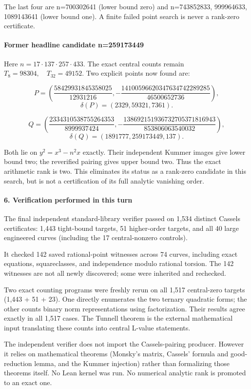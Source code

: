 \documentclass[11pt]{article}
\begin{document}
The last four are n=700302641 (lower bound zero) and n=743852833, 999964633, 1089143641 (lower bound one). A finite failed point search is never a rank-zero certificate.

\paragraph{Former headline candidate n=259173449}

Here \(n=17\cdot137\cdot257\cdot433\). The exact central counts remain \(T_8=98304,\quad T_{32}=49152\). Two explicit points now found are:

\[
P=\left(\frac{58429931845358025}{12931216},
-\frac{14100596620347634742289285}{46500652736}\right),
\] \[\delta(P)=(2329,59321,7361).\]

\[
Q=\left(\frac{2334310538755264353}{8999937424},
-\frac{138692151936732705371816943}{853806063540032}\right),
\] \[\delta(Q)=(1891777,259173449,137).\]

Both lie on \(y^2=x^3-n^2x\) exactly. Their independent Kummer images give lower bound two; the reverified pairing gives upper bound two. Thus the exact arithmetic rank is two. This eliminates its status as a rank-zero candidate in this search, but is not a certification of its full analytic vanishing order.

\paragraph{6. Verification performed in this turn}

The final independent standard-library verifier passed on 1,534 distinct Cassels certificates: 1,443 tight-bound targets, 51 higher-order targets, and all 40 large engineered curves (including the 17 central-nonzero controls).

It checked 142 saved rational-point witnesses across 74 curves, including exact equations, squareclasses, and independence modulo rational torsion. The 142 witnesses are not all newly discovered; some were inherited and rechecked.

Two exact counting programs were freshly rerun on all 1,517 central-zero targets (1,443 + 51 + 23). One directly enumerates the two ternary quadratic forms; the other counts binary norm representations using factorization. Their results agree exactly in all 1,517 cases. The Tunnell theorem is the external mathematical input translating these counts into central L-value statements.

The independent verifier does not import the Cassels-pairing producer. However it relies on mathematical theorems (Monsky's matrix, Cassels' formula and good-reduction lemma, and the Kummer injection) rather than formalizing those theorems itself. No Lean kernel was run. No numerical analytic rank is promoted to an exact one.
\end{document}
